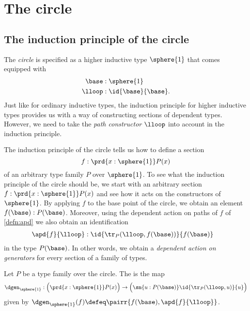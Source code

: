 
\section{The circle}\label{sec:circle}

\subsection{The induction principle of the circle}

The \emph{circle} is specified as a higher inductive type $\sphere{1}$ that comes equipped with
\begin{align*}
\base & : \sphere{1} \\
\lloop & : \id{\base}{\base}.
\end{align*}
Just like for ordinary inductive types, the induction principle for higher inductive types provides us with a way of constructing sections of dependent types. However, we need to take the \emph{path constructor} $\lloop$ into account in the induction principle. 

The induction principle of the circle tells us how to define a section
\begin{equation*}
  f:\prd{x:\sphere{1}}P(x)
\end{equation*}
of an arbitrary type family $P$ over $\sphere{1}$. To see what the induction principle of the circle should be, we start with an arbitrary section $f:\prd{x:\sphere{1}}P(x)$ and see how it acts on the constructors of $\sphere{1}$. By applying $f$ to the base point of the circle, we obtain an element $f(\base):P(\base)$. Moreover, using the dependent action on paths of $f$ of \cref{defn:apd} we also obtain an identification
\begin{align*}
\apd{f}{\lloop} & : \id{\tr_P(\lloop,f(\base))}{f(\base)}
\end{align*}
in the type $P(\base)$. In other words, we obtain a \emph{dependent action on generators} for every section of a family of types.

\begin{defn}
Let $P$ be a type family over the circle. The  is the map
\begin{equation}\label{eq:dgen_circle}
\dgen_{\sphere{1}}:\Big(\prd{x:\sphere{1}}P(x)\Big)\to\Big(\sm{u:P(\base)}\id{\tr_P(\lloop,u)}{u}\Big)
\end{equation}
given by $\dgen_{\sphere{1}}(f)\defeq\pairr{f(\base),\apd{f}{\lloop}}$.
\end{defn}

